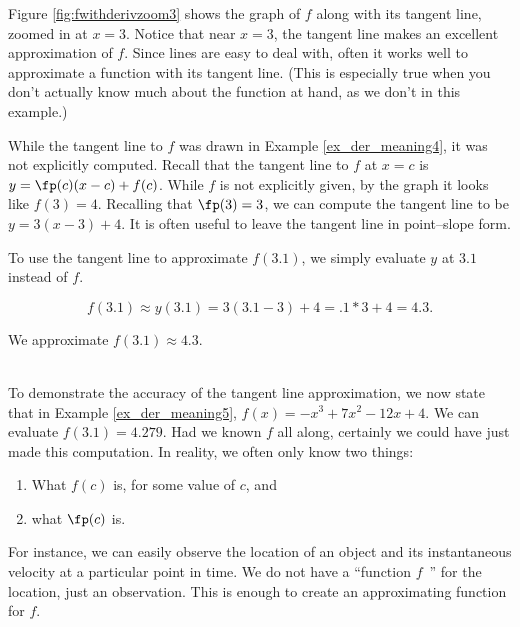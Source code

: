{Figure \ref{fig:fwithderivzoom3} shows the graph of $f$ along with its tangent line, zoomed in at $x=3$. Notice that near $x=3$, the tangent line makes an excellent approximation of $f$. Since lines are easy to deal with, often it works well to approximate a function with its tangent line. (This is especially true when you don't actually know much about the function at hand, as we don't in this example.)


While the tangent line to $f$ was drawn in Example \ref{ex_der_meaning4}, it was not explicitly computed. Recall that the tangent line to $f$ at $x=c$ is $y = \fp(c)(x-c)+f(c)$. While $f$ is not explicitly given, by the graph it looks like $f(3) = 4$. Recalling that $\fp(3) = 3$, we can compute the tangent line to be $y = 3(x-3)+4.$ It is often useful to leave the tangent line in point--slope form.

To use the tangent line to approximate $f(3.1)$, we simply evaluate $y$ at $3.1$ instead of $f$.

$$f(3.1) \approx y(3.1) = 3(3.1-3)+4 = .1*3+4 = 4.3.$$ 

We approximate $f(3.1) \approx 4.3.$
}\\

To demonstrate the accuracy of the tangent line approximation, we now state that in Example \ref{ex_der_meaning5}, $f(x) = -x^3+7x^2-12x+4$. We can evaluate $f(3.1) = 4.279$. Had we known $f$ all along, certainly we could have just made this computation. In reality, we often only know two things:
	\begin{enumerate}
	\item		What $f(c)$ is, for some value of $c$, and
	\item		what $\fp(c)$ is.
	\end{enumerate}
	
For instance, we can easily observe the location of an object and its instantaneous velocity at a particular point in time. We do not have a ``function $f$\ '' for the location, just an observation. This is enough to create an approximating function for $f$.


